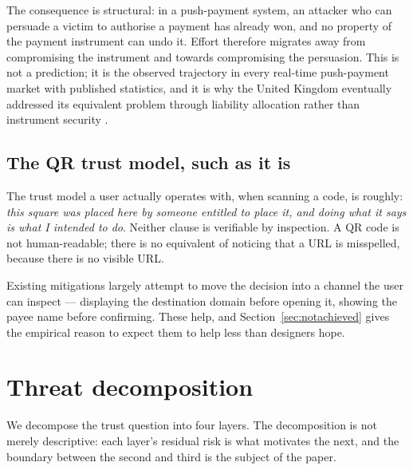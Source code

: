 \documentclass[10pt,a4paper,twocolumn]{article}
\begin{document}
The consequence is structural: in a push-payment system, an attacker who can
persuade a victim to authorise a payment has already won, and no property of the
payment instrument can undo it. Effort therefore migrates away from compromising
the instrument and towards compromising the persuasion. This is not a
prediction; it is the observed trajectory in every real-time push-payment market
with published statistics, and it is why the United Kingdom eventually addressed
its equivalent problem through liability allocation rather than instrument
security \citep{psr2024app}.

\subsection{The QR trust model, such as it is}

The trust model a user actually operates with, when scanning a code, is roughly:
\emph{this square was placed here by someone entitled to place it, and doing
what it says is what I intended to do}. Neither clause is verifiable by
inspection. A QR code is not human-readable; there is no equivalent of noticing
that a URL is misspelled, because there is no visible URL.

Existing mitigations largely attempt to move the decision into a channel the
user can inspect --- displaying the destination domain before opening it, showing
the payee name before confirming. These help, and Section~\ref{sec:notachieved}
gives the empirical reason to expect them to help less than designers hope.

\section{Threat decomposition}
\label{sec:layers}

We decompose the trust question into four layers. The decomposition is not
merely descriptive: each layer's residual risk is what motivates the next, and
the boundary between the second and third is the subject of the paper.
\end{document}
